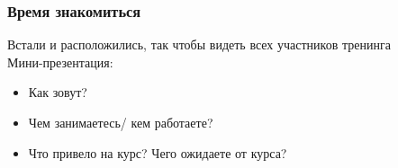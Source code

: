 \begin{frame}
\frametitle{Время знакомиться}
Встали и расположились, так чтобы видеть всех участников тренинга \\
Мини-презентация:
\begin{itemize}
    \item Как зовут? 
    \item Чем занимаетесь/ кем работаете?
    \item Что привело на курс? Чего ожидаете от курса?
\end{itemize}
\end{frame}
